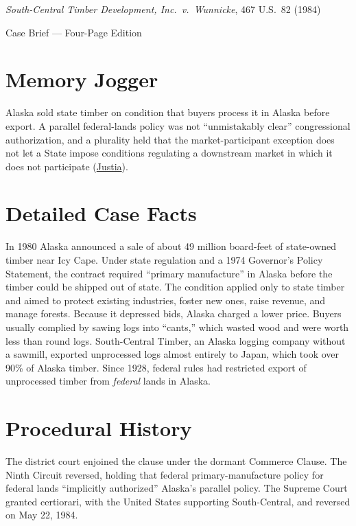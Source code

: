 \documentclass[12pt]{article}
\begin{document}
\begin{center}
{\LARGE \textit{South-Central Timber Development, Inc.\ v.\ Wunnicke}, 467 U.S.\ 82 (1984)\par}
\vspace{0.8em}
{\large Case Brief --- Four-Page Edition\par}
\end{center}
\vspace{1em}

\section{Memory Jogger}

Alaska sold state timber on condition that buyers process it in Alaska before export. A parallel federal-lands policy was not ``unmistakably clear'' congressional authorization, and a plurality held that the market-participant exception does not let a State impose conditions regulating a downstream market in which it does not participate (\href{https://supreme.justia.com/cases/federal/us/467/82/}{Justia}).

\section{Detailed Case Facts}

In 1980 Alaska announced a sale of about 49 million board-feet of state-owned timber near Icy Cape. Under state regulation and a 1974 Governor's Policy Statement, the contract required ``primary manufacture'' in Alaska before the timber could be shipped out of state. The condition applied only to state timber and aimed to protect existing industries, foster new ones, raise revenue, and manage forests. Because it depressed bids, Alaska charged a lower price. Buyers usually complied by sawing logs into ``cants,'' which wasted wood and were worth less than round logs. South-Central Timber, an Alaska logging company without a sawmill, exported unprocessed logs almost entirely to Japan, which took over 90\% of Alaska timber. Since 1928, federal rules had restricted export of unprocessed timber from \emph{federal} lands in Alaska.

\section{Procedural History}

The district court enjoined the clause under the dormant Commerce Clause. The Ninth Circuit reversed, holding that federal primary-manufacture policy for federal lands ``implicitly authorized'' Alaska's parallel policy. The Supreme Court granted certiorari, with the United States supporting South-Central, and reversed on May 22, 1984.
\end{document}
